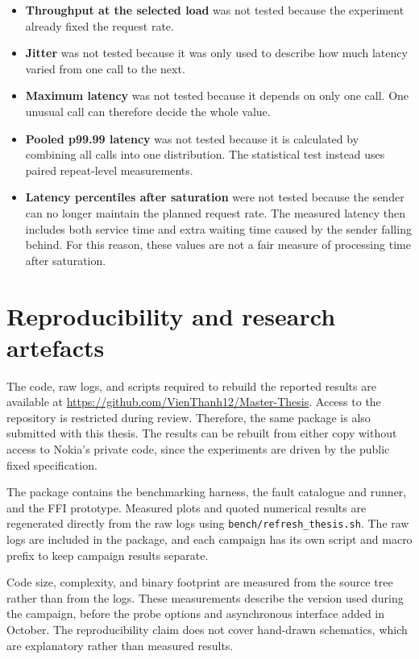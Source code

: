 \documentclass[english,oneside,a4paper,censored,csm,software-track-2020]{HYthesisML}
\begin{document}
\begin{itemize}
  \item \textbf{Throughput at the selected load} was not tested because the experiment
  already fixed the request rate.

  \item \textbf{Jitter} was not tested because it was only used to describe how much
  latency varied from one call to the next.

  \item \textbf{Maximum latency} was not tested because it depends on only one call.
  One unusual call can therefore decide the whole value.

  \item \textbf{Pooled p99.99 latency} was not tested because it is calculated by
  combining all calls into one distribution. The statistical test instead uses paired
  repeat-level measurements.

  \item \textbf{Latency percentiles after saturation} were not tested because the sender
  can no longer maintain the planned request rate. The measured latency then includes
  both service time and extra waiting time caused by the sender falling behind. For this
  reason, these values are not a fair measure of processing time after saturation.
\end{itemize}
\section{Reproducibility and research artefacts}\label{sec:repro}
The code, raw logs, and scripts required to rebuild the reported results are available at
\url{https://github.com/VienThanh12/Master-Thesis}. Access to the repository is
restricted during review. Therefore, the same package is also submitted with this thesis.
The results can be rebuilt from either copy without access to Nokia's private code, since
the experiments are driven by the public fixed specification.

The package contains the benchmarking harness, the fault catalogue and runner, and the
FFI prototype. Measured plots and quoted numerical results are regenerated directly from
the raw logs using \texttt{bench/refresh\_thesis.sh}. The raw logs are included in the
package, and each campaign has its own script and macro prefix to keep campaign results
separate.

Code size, complexity, and binary footprint are measured from the source tree rather
than from the logs. These measurements describe the version used during the campaign,
before the probe options and asynchronous interface added in October. The reproducibility
claim does not cover hand-drawn schematics, which are explanatory rather than measured
results.
\end{document}
